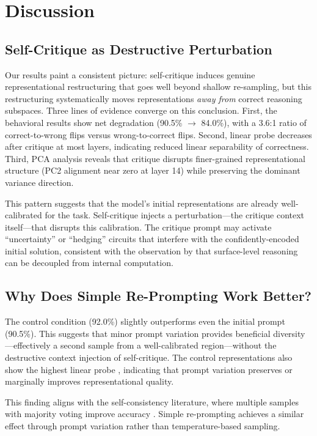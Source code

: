 \section{Discussion}
\label{sec:discussion}

\subsection{Self-Critique as Destructive Perturbation}

Our results paint a consistent picture: self-critique induces genuine representational restructuring that goes well beyond shallow re-sampling, but this restructuring systematically moves representations \emph{away from} correct reasoning subspaces. Three lines of evidence converge on this conclusion. First, the behavioral results show net degradation (90.5\% $\to$ 84.0\%), with a 3.6:1 ratio of correct-to-wrong flips versus wrong-to-correct flips. Second, linear probe \auc decreases after critique at most layers, indicating reduced linear separability of correctness. Third, PCA analysis reveals that critique disrupts finer-grained representational structure (PC2 alignment near zero at layer 14) while preserving the dominant variance direction.

This pattern suggests that the model's initial representations are already well-calibrated for the task. Self-critique injects a perturbation---the critique context itself---that disrupts this calibration. The critique prompt may activate ``uncertainty'' or ``hedging'' circuits that interfere with the confidently-encoded initial solution, consistent with the observation by \citet{turpin2024unfaithful} that surface-level reasoning can be decoupled from internal computation.

\subsection{Why Does Simple Re-Prompting Work Better?}

The control condition (92.0\%) slightly outperforms even the initial prompt (90.5\%). This suggests that minor prompt variation provides beneficial diversity---effectively a second sample from a well-calibrated region---without the destructive context injection of self-critique. The control representations also show the highest linear probe \auc, indicating that prompt variation preserves or marginally improves representational quality.

This finding aligns with the self-consistency literature, where multiple samples with majority voting improve accuracy \cite{wang2023selfconsistency}. Simple re-prompting achieves a similar effect through prompt variation rather than temperature-based sampling.

